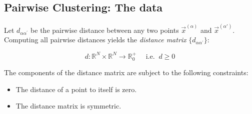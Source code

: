 \begin{frame}
\section{Pairwise Clustering: The data}


Let $d_{\alpha \alpha^{'}}$ be the pairwise distance between any two points $\vec x^{(\alpha)}$ and $\vec x^{(\alpha')}$. Computing all pairwise distances yields the \emph{distance matrix} $\big\{ d_{\alpha \alpha^{'}} \big\}$:

\begin{equation}
\label{eq:pairwisedistdef}
d: \mathbb{R}^N \times \mathbb{R}^N 
    \rightarrow \mathbb{R}_0^+ \quad\text{ i.e.}\;\; d \ge 0
\end{equation}

The components of the distance matrix are subject to the following constraints:
\begin{itemize}
\item The distance of a point to itself is zero.
\item The distance matrix is symmetric.
\end{itemize}

\end{frame}
